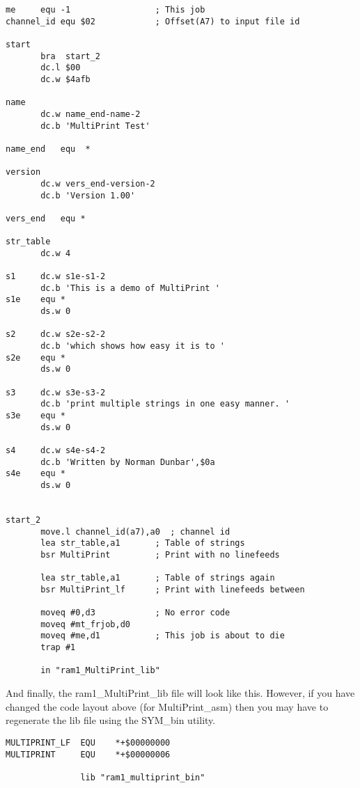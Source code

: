 \begin{lstlisting}[firstnumber=1,caption={Testing the Multiprint Utility}]
me	   equ -1                 ; This job
channel_id equ $02            ; Offset(A7) to input file id

start	   
       bra  start_2
       dc.l $00
       dc.w $4afb

name	   
       dc.w name_end-name-2
       dc.b 'MultiPrint Test'

name_end   equ	*

version    
       dc.w vers_end-version-2
       dc.b 'Version 1.00'

vers_end   equ *

str_table
       dc.w 4

s1     dc.w s1e-s1-2
       dc.b 'This is a demo of MultiPrint '
s1e    equ *
       ds.w 0

s2     dc.w s2e-s2-2
       dc.b 'which shows how easy it is to '
s2e    equ *
       ds.w 0

s3     dc.w s3e-s3-2
       dc.b 'print multiple strings in one easy manner. '
s3e    equ *
       ds.w 0

s4     dc.w s4e-s4-2
       dc.b 'Written by Norman Dunbar',$0a
s4e    equ *
       ds.w 0


start_2
       move.l channel_id(a7),a0  ; channel id
       lea str_table,a1       ; Table of strings
       bsr MultiPrint         ; Print with no linefeeds

       lea str_table,a1       ; Table of strings again
       bsr MultiPrint_lf      ; Print with linefeeds between

       moveq #0,d3            ; No error code
       moveq #mt_frjob,d0
       moveq #me,d1           ; This job is about to die
       trap #1
       
       in "ram1_MultiPrint_lib"

\end{lstlisting}

And finally, the ram1\_MultiPrint\_lib file will look like this. However, if you have changed the code layout above (for MultiPrint\_asm) then you may have to regenerate the lib file using the SYM\_bin utility.

\begin{lstlisting}[firstnumber=1,caption={The Multiprint Library File}]
MULTIPRINT_LF  EQU    *+$00000000
MULTIPRINT     EQU    *+$00000006

               lib "ram1_multiprint_bin"
\end{lstlisting}

